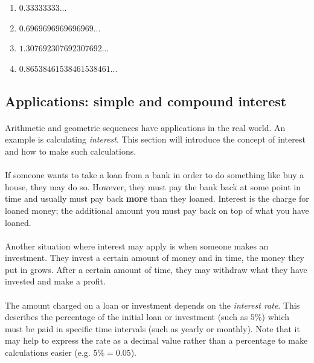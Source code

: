 \documentclass[12pt, a4paper, titlepage, twoside]{article}
\begin{document}
	\begin{multicols}{2}
		\begin{enumerate}[label=\textbf{(\alph*)}]
			\item $0.33333333...$
			\item $0.6969696969696969...$
			\item $1.307692307692307692...$
			\item $0.86538461538461538461...$
		\end{enumerate}
	\end{multicols}

	\hfill
	
	\subsection{Applications: simple and compound interest}
	
	\paragraph{}
	Arithmetic and geometric sequences have applications in the real world. An example is calculating \textit{interest}. This section will
	introduce the concept of interest and how to make such calculations.
	
	\paragraph{}
	If someone wants to take a loan from a bank in order to do something like buy a house, they may do so. However, they must
	pay the bank back at some point in time and usually must pay back \textbf{more} than they loaned. Interest is the charge for
	loaned money; the additional amount you must pay back on top of what you have loaned.
	
	\paragraph{}
	Another situation where interest may apply is when someone makes an investment. They invest a certain amount of money and in 
	time, the money they put in grows. After a certain amount of time, they may withdraw what they have invested and make a profit.
	
	\paragraph{}
	The amount charged on a loan or investment depends on the \textit{interest rate}. This describes the percentage of the initial
	loan or investment (such as $5\%$) which must be paid in specific time intervals (such as yearly or monthly). Note that it may help
	to express the rate as a decimal value rather than a percentage to make calculations easier (e.g. $5\% = 0.05$).
	
\end{document}

